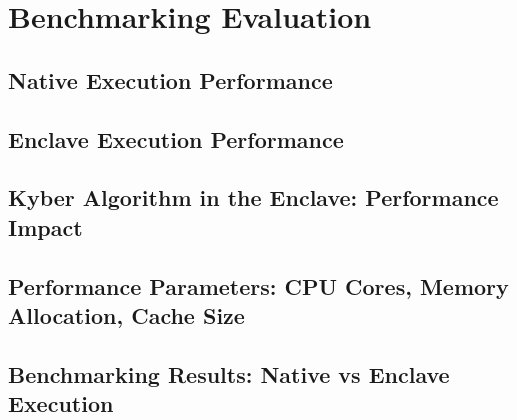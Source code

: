\chapter{Benchmarking Evaluation}
\label{chap:benchmarking}

\section{Native Execution Performance}

\section{Enclave Execution Performance}

\section{Kyber Algorithm in the Enclave: Performance Impact}

\section{Performance Parameters: CPU Cores, Memory Allocation, Cache Size}

\section{Benchmarking Results: Native vs Enclave Execution}
